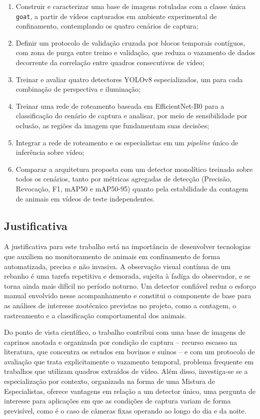 \documentclass[12pt]{article}
\begin{document}
\begin{enumerate}[label=\roman*.]
    \item Construir e caracterizar uma base de imagens rotuladas com a classe única \texttt{goat}, a partir de vídeos capturados em ambiente experimental de confinamento, contemplando os quatro cenários de captura;
    \item Definir um protocolo de validação cruzada por blocos temporais contíguos, com zona de purga entre treino e validação, que reduza o vazamento de dados decorrente da correlação entre quadros consecutivos de vídeo;
    \item Treinar e avaliar quatro detectores YOLOv8 especializados, um para cada combinação de perspectiva e iluminação;
    \item Treinar uma rede de roteamento baseada em EfficientNet-B0 para a classificação do cenário de captura e analisar, por meio de sensibilidade por oclusão, as regiões da imagem que fundamentam suas decisões;
    \item Integrar a rede de roteamento e os especialistas em um \textit{pipeline} único de inferência sobre vídeo;
    \item Comparar a arquitetura proposta com um detector monolítico treinado sobre todos os cenários, tanto por métricas agregadas de detecção (Precisão, Revocação, F1, mAP50 e mAP50-95) quanto pela estabilidade da contagem de animais em vídeos de teste independentes.
\end{enumerate}

\subsection{Justificativa}
\label{subsec:justificativa}

A justificativa para este trabalho está na importância de desenvolver tecnologias que auxiliem no monitoramento de animais em confinamento de forma automatizada, precisa e não invasiva. A observação visual contínua de um rebanho é uma tarefa repetitiva e demorada, sujeita à fadiga do observador, e se torna ainda mais difícil no período noturno. Um detector confiável reduz o esforço manual envolvido nesse acompanhamento e constitui o componente de base para as análises de interesse zootécnico previstas no projeto, como a contagem, o rastreamento e a classificação comportamental dos animais.

Do ponto de vista científico, o trabalho contribui com uma base de imagens de caprinos anotada e organizada por condição de captura -- recurso escasso na literatura, que concentra os estudos em bovinos e suínos \cite{nasirahmadi2017, rohan2023deep_livestock_survey} -- e com um protocolo de avaliação que trata explicitamente o vazamento temporal, problema frequente em trabalhos que utilizam quadros extraídos de vídeo. Além disso, investiga-se se a especialização por contexto, organizada na forma de uma Mistura de Especialistas, oferece vantagens em relação a um detector único, uma pergunta de interesse para aplicações em que as condições de captura variam de forma previsível, como é o caso de câmeras fixas operando ao longo do dia e da noite.
\end{document}

